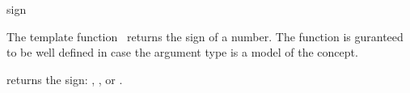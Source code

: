 \begin{ccRefFunction}{sign}

\ccDefinition

The template function \ccRefName\ returns the sign of a number.
The function is guranteed to be well defined in case the argument type 
is a model of the  concept. 


{returns the sign: , , or .}

\ccSeeAlso

\\
\\

\end{ccRefFunction}

